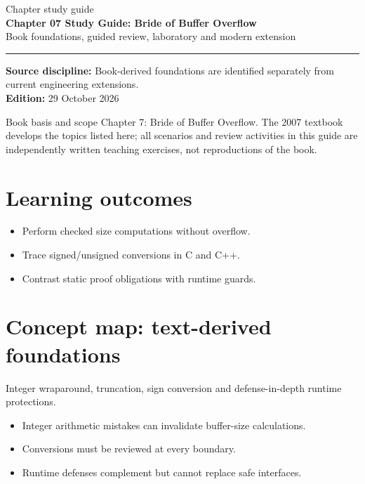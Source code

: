 \documentclass[10pt,letterpaper]{article}
\begin{document}
\hypersetup{pageanchor=false}%
\begin{titlepage}
\vspace*{1.0in}
{\color{bluegray}\Large Chapter study guide}\\[1.0em]
{\color{navy}\Huge\bfseries Chapter 07 Study Guide: Bride of Buffer Overflow}\\[0.7em]
{\Large Book foundations, guided review, laboratory and modern extension}\\[2.0em]
\rule{\linewidth}{1.0pt}
\vfill
\textbf{Source discipline:} Book-derived foundations are identified separately from current engineering extensions.\\
\textbf{Edition:} 29 October 2026
\end{titlepage}\hypersetup{pageanchor=true}
\tableofcontents
\clearpage
\begin{focusbox}{Book basis and scope}
Chapter 7: Bride of Buffer Overflow. The 2007 textbook develops the topics listed here; all scenarios and review activities in this guide are independently written teaching exercises, not reproductions of the book.\end{focusbox}
\section{Learning outcomes}
\begin{itemize}
\item Perform checked size computations without overflow.
\item Trace signed/unsigned conversions in C and C++.
\item Contrast static proof obligations with runtime guards.
\end{itemize}

\section{Concept map: text-derived foundations}
Integer wraparound, truncation, sign conversion and defense-in-depth runtime protections.
\begin{itemize}
\item Integer arithmetic mistakes can invalidate buffer-size calculations.
\item Conversions must be reviewed at every boundary.
\item Runtime defenses complement but cannot replace safe interfaces.
\end{itemize}
\end{document}
